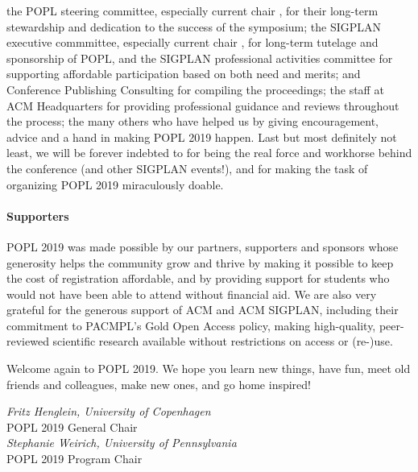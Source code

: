 %
the POPL steering committee, especially current
chair , for their  
long-term stewardship and dedication to the success
of the symposium;
%
the SIGPLAN executive commmittee, especially current chair , for long-term tutelage and sponsorship of POPL, and the SIGPLAN professional activities committee for supporting affordable participation based on both need and merits;
%
%
%
%
%
%
 and Conference Publishing Consulting
for compiling the proceedings;
the staff at ACM Headquarters for providing professional guidance and reviews throughout the process;
% 
the many others who have helped us by giving encouragement, advice and a hand in making POPL 2019 happen. 
%
%
Last but most definitely not least, we will be forever indebted to
for being the real force and workhorse behind the conference
(and other SIGPLAN events!), and for making the
task of organizing POPL 2019 miraculously doable.

\paragraph{Supporters}
%
POPL 2019 was made possible by our partners, supporters
and sponsors whose generosity helps the community grow
and thrive by making it possible to keep the cost of
registration affordable, and by providing support for
students who would not have been able to attend without
financial aid.
%
We are also very grateful for the generous support of
ACM and ACM SIGPLAN, including their commitment to
PACMPL's Gold Open Access policy, making high-quality,
peer-reviewed scientific research available without
restrictions on access or (re-)use.

\medskip
Welcome again to POPL 2019. We hope you learn new things,
have fun, meet old friends and colleagues, make new
ones, and go home inspired!

\begin{flushright}
\textit{Fritz Henglein, University of Copenhagen} \\
POPL 2019 General Chair
\medskip \\
\textit{Stephanie Weirich, University of Pennsylvania} \\
POPL 2019 Program Chair
\medskip \\
\end{flushright}




\newpage
